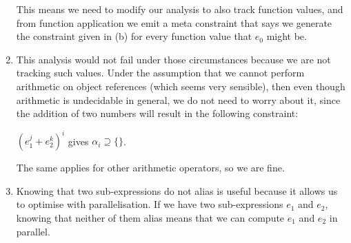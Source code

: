 \begin{enumerate}[label=(\alph*)]
        This means we need to modify our analysis to also track function values, and from function application we emit a meta constraint that says we generate the constraint given in (b) for every function value that $e_0$ might be.

        \item
          This analysis would not fail under those circumstances because we are not tracking such values. Under the assumption that we cannot perform arithmetic on object references (which seems very sensible), then even though  arithmetic is undecidable in general, we do not need to worry about it, since the addition of two numbers will result in the following constraint:

          $(e_1^j + e_2^k)^i$ gives $\alpha_i \supseteq \{\}$.

          The same applies for other arithmetic operators, so we are fine.

          \item
            Knowing that two sub-expressions do not alias is useful because it allows us to optimise with parallelisation. If we have two sub-expressions $e_1$ and $e_2$, knowing that neither of them alias means that we can compute $e_1$ and $e_2$ in parallel.

        
    \end{enumerate}


